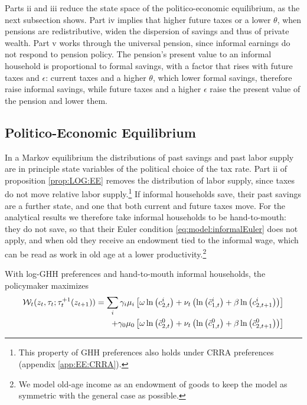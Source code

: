 Parts ii and iii reduce the state space of the politico-economic equilibrium, as the next subsection shows. Part iv implies that higher future taxes or a lower $\theta$, when pensions are redistributive, widen the dispersion of savings and thus of private wealth. Part v works through the universal pension, since informal earnings do not respond to pension policy. The pension's present value to an informal household is proportional to formal savings, with a factor that rises with future taxes and $\epsilon$: current taxes and a higher $\theta$, which lower formal savings, therefore raise informal savings, while future taxes and a higher $\epsilon$ raise the present value of the pension and lower them.


\subsection{Politico-Economic Equilibrium}

In a Markov equilibrium the distributions of past savings and past labor supply are in principle state variables of the political choice of the tax rate. Part ii of proposition \ref{prop:LOG:EE} removes the distribution of labor supply, since taxes do not move relative labor supply.\footnote{This property of GHH preferences also holds under CRRA preferences (appendix \ref{app:EE:CRRA}).} If informal households save, their past savings are a further state, and one that both current and future taxes move. For the analytical results we therefore take informal households to be hand-to-mouth: they do not save, so that their Euler condition \eqref{eq:model:informalEuler} does not apply, and when old they receive an endowment tied to the informal wage, which can be read as work in old age at a lower productivity.\footnote{We model old-age income as an endowment of goods to keep the model as symmetric with the general case as possible.}

With log-GHH preferences and hand-to-mouth informal households, the policymaker maximizes
\begin{align}\label{eq:LOG:PolObj}
    \mathcal{W}_t(z_t,\tau_t; \tau_t^{+1}(z_{t+1})) = \sum_i \gamma_i \mu_i&\left[\omega \ln\left(c_{2,t}^i\right)+\nu_t\left(\ln\left(\tilde{c}_{1,t}^i\right)+\beta\ln\left(c_{2,t+1}^i\right)\right)\right] \notag \\
    +\gamma_0\mu_0&\left[\omega \ln\left(\tilde{c}_{2,t}^0\right)+\nu_t\left(\ln\left(\tilde{c}_{1,t}^0\right)+\beta \ln\left(\tilde{c}_{2,t+1}^0\right)\right)\right]
\end{align}

